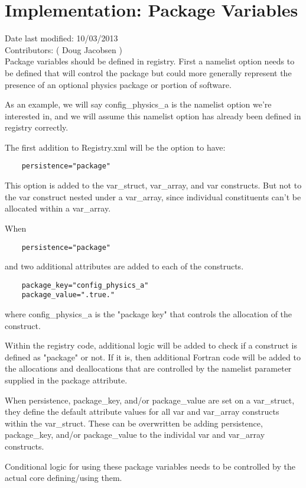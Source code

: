 \documentclass[11pt]{report}
\begin{document}
\section{Implementation: Package Variables}
Date last modified: 10/03/2013 \\
Contributors: ( Doug Jacobsen ) \\

Package variables should be defined in registry. First a namelist option needs
to be defined that will control the package but could more generally represent
the presence of an optional physics package or portion of software. 

As an example, we will say config\_physics\_a is the namelist option we're
interested in, and we will assume this namelist option has already been defined
in registry correctly.

The first addition to Registry.xml will be the option to have:
\begin{lstlisting}
	persistence="package"
\end{lstlisting}

This option is added to the var\_struct, var\_array, and var constructs.
But not to the var construct nested under a var\_array, since individual
constituents can't be allocated within a var\_array.

When
\begin{lstlisting}
	persistence="package"
\end{lstlisting}
and two additional attributes are added to each of the constructs.
\begin{lstlisting}
	package_key="config_physics_a"
	package_value=".true."
\end{lstlisting}
where config\_physics\_a is the "package key" that controls the allocation of the construct.

Within the registry code, additional logic will be added to check if a
construct is defined as "package" or not. If it is, then additional Fortran
code will be added to the allocations and deallocations that are controlled by
the namelist parameter supplied in the package attribute.

When persistence, package\_key, and/or package\_value are set on a var\_struct,
they define the default attribute values for all var and var\_array constructs
within the var\_struct. These can be overwritten be adding persistence, 
package\_key, and/or package\_value to the individal var and var\_array constructs.

Conditional logic for using these package variables needs to be controlled by
the actual core defining/using them.
\end{document}
